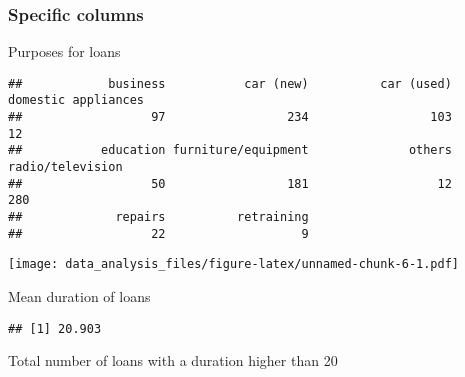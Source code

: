 \documentclass[
]{article}
\newenvironment{Shaded}{\begin{snugshade}}{\end{snugshade}}
\newcommand{\DecValTok}[1]{\textcolor[rgb]{0.00,0.00,0.81}{#1}}
\newcommand{\FunctionTok}[1]{\textcolor[rgb]{0.00,0.00,0.00}{#1}}
\newcommand{\NormalTok}[1]{#1}
\newcommand{\OtherTok}[1]{\textcolor[rgb]{0.56,0.35,0.01}{#1}}
\newcommand{\SpecialCharTok}[1]{\textcolor[rgb]{0.00,0.00,0.00}{#1}}
\begin{document}
\hypertarget{specific-columns}{%
\subsubsection{Specific columns}\label{specific-columns}}

Purposes for loans

\begin{Shaded}
\end{Shaded}

\begin{verbatim}
##            business           car (new)          car (used) domestic appliances 
##                  97                 234                 103                  12 
##           education furniture/equipment              others    radio/television 
##                  50                 181                  12                 280 
##             repairs          retraining 
##                  22                   9
\end{verbatim}

\begin{Shaded}
\end{Shaded}

\texttt{[image: data\_analysis\_files/figure-latex/unnamed-chunk-6-1.pdf]}

Mean duration of loans

\begin{Shaded}
\end{Shaded}

\begin{verbatim}
## [1] 20.903
\end{verbatim}

Total number of loans with a duration higher than 20

\begin{Shaded}
\end{Shaded}
\end{document}
